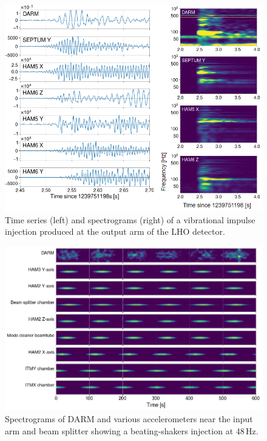 \documentclass[11pt]{article}
\begin{document}
\begin{figure}[h!]
	\centering
	\includegraphics[width=\textwidth]{figures/noise-impulse.png}
	\caption{
		Time series (left) and spectrograms (right) of a vibrational impulse injection produced at the output arm of the LHO detector.}
	\label{fig:noise-impulse}
\end{figure}

\begin{figure}[h!]
	\centering
	\includegraphics[width=\textwidth]{figures/noise-beat-spectrograms.png}
	\caption{
		Spectrograms of DARM and various accelerometers near the input arm and beam splitter showing a beating-shakers injection at 48\,Hz.}
	\label{fig:noise-beats}
\end{figure}
\end{document}
